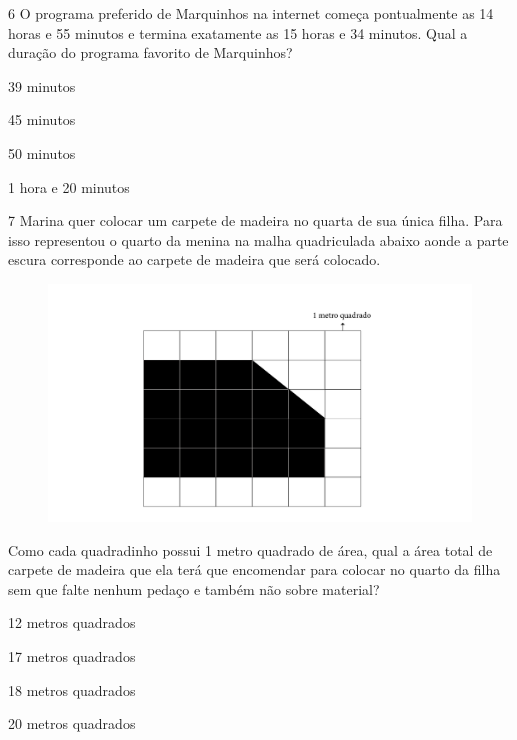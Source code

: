 \num{6} O programa preferido de Marquinhos na internet começa pontualmente
as 14 horas e 55 minutos e termina exatamente as 15 horas e 34 minutos.
Qual a duração do programa favorito de Marquinhos?

\begin{escolha}
\item
  39 minutos
\item
  45 minutos
\item
  50 minutos
\item
  1 hora e 20 minutos
\end{escolha}


\num{7} Marina quer colocar um carpete de madeira no quarta de sua única
filha. Para isso representou o quarto da menina na malha quadriculada
abaixo aonde a parte escura corresponde ao carpete de madeira que será
colocado.

\begin{figure}[htpb!]
\includegraphics[width=\textwidth]{../ilustracoes/MAT5/SAEB_5ANO_MAT_figura122.png}
\end{figure}

Como cada quadradinho possui 1 metro quadrado de área, qual a área total
de carpete de madeira que ela terá que encomendar para colocar no quarto
da filha sem que falte nenhum pedaço e também não sobre material?

\begin{escolha}
\item
  12 metros quadrados
\item
  17 metros quadrados
\item
  18 metros quadrados
\item
  20 metros quadrados
\end{escolha}

